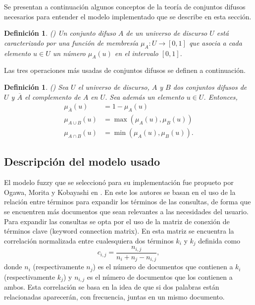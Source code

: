 \documentclass{llncs}
\newtheorem{defn}[theorem]{Definici\'on}
\begin{document}
		Se presentan a continuaci\'on algunos conceptos de la teor\'ia de conjuntos difusos necesarios para entender el modelo implementado que se describe en esta secci\'on.
		\begin{defn} (\cite[Section~2.6.1]{B2}) Un conjunto difuso $A$ de un universo de discurso $U$ est\'a caracterizado por una funci\'on de membres\'ia $\mu_A : U \rightarrow [0,1]$ que asocia a cada elemento $u \in U$ un n\'umero $\mu_A(u)$ en el intervalo $[0,1].$
		\end{defn}
		Las tres operaciones m\'as usadas de conjuntos difusos se definen a continuaci\'on.
		\begin{defn} \label{def2} (\cite[Section~2.6.1]{B2})
			Sea $U$ el universo de discurso, $A$ y $B$ dos conjuntos difusos de $U$ y $\overline{A}$ el complemento de $A$ en $U$. Sea adem\'as un elemento $u \in U$. Entonces, 
			\begin{align*}
				\mu_{\overline{A}}(u) &= 1- \mu_A(u) \\
				\mu_{A \cup B}(u) &= \max(\mu_A(u), \mu_B(u))  \\
				\mu_{A\cap B}(u) &= \min(\mu_A(u), \mu_B(u)).
			\end{align*}
			
		\end{defn}
	
	
	\subsection{Descripci\'on del modelo usado}
	
	El modelo fuzzy que se seleccion\'o para su implementaci\'on fue propueto por Ogawa, Morita y Kobayashi en \cite{B5}. En este los autores se basan en el uso de la relaci\'on entre t\'erminos para expandir los t\'erminos de las consultas, de forma que se encuentren m\'as documentos que sean relevantes a las necesidades del usuario. Para expandir las consultas se opta por el uso de la matriz de conexi\'on de t\'erminos clave (keyword connection matrix). En esta matriz se encuentra la correlaci\'on normalizada entre cualesquiera dos t\'erminos $k_i$ y $k_j$ definida como
	\[
		c_{i,j} = \frac{n_{i,j}}{n_i + n_j - n_{i,j}},
	\]
	donde $n_i$ (respectivamente $n_j$) es el n\'umero de documentos que contienen a $k_i$ (respectivamente $k_j$) y $n_{i,j}$ es el n\'umero de documentos que los contienen a ambos. Esta correlaci\'on se basa en la idea de que si dos palabras est\'an relacionadas aparecer\'an, con frecuencia, juntas en un mismo documento.
	
\end{document}
